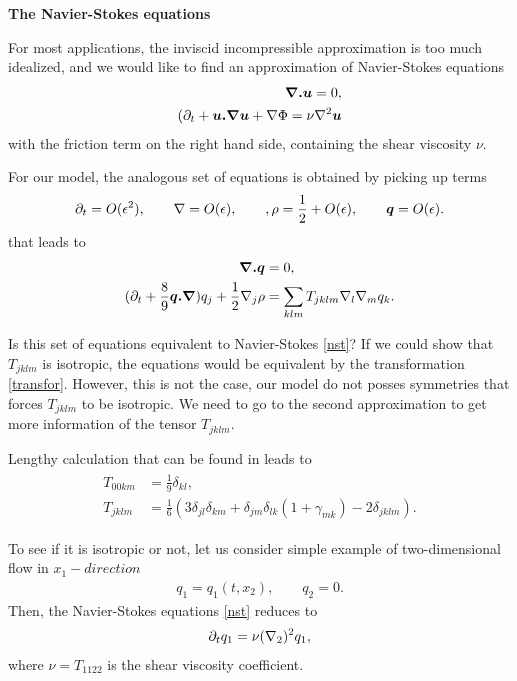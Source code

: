 \bigskip

\textbf{The Navier-Stokes equations}

For most applications, the inviscid incompressible approximation is too much idealized,
and we would like to find an approximation of Navier-Stokes equations
\begin{align} \label{nst}
\begin{split}
\bm{\nabla . u} = 0, \\
(\partial_t + \bm{u.\nabla}\bm{u} + \nabla \Phi = \nu \nabla^2 \bm{u}
\end{split}
\end{align}
with the friction term on the right hand side, containing the shear viscosity $\nu$.

For our model, the analogous set of equations is obtained by picking up terms
\begin{align}
\partial_t = O(\epsilon^2), \qquad \nabla = O(\epsilon), \qquad, \rho = \frac{1}{2} + O(\epsilon), \qquad \bm{q} = O(\epsilon).
\end{align} 
that leads to
\begin{align}
\begin{split}
\bm{\nabla . q} &= 0,\\ 
(\partial_t + \frac{8}{9} \bm{q . \nabla}) q_j + \frac{1}{2}\nabla_j\rho &= \sum_{klm} T_{jklm}\nabla_l \nabla_m q_k.
\end{split}
\end{align}

Is this set of equations equivalent to Navier-Stokes \ref{nst}?
If we could show that $T_{jklm}$ is isotropic, the equations would be equivalent by the transformation \ref{transfor}.
However, this is not the case, our model do not posses symmetries that forces $T_{jklm}$ to be isotropic.
We need to go to the second approximation to get more information of the tensor $T_{jklm}$.

Lengthy calculation that can be found in \cite{nasilowski} leads to
\begin{align} \label{vistens}
\begin{split}
T_{00km} &= \frac{1}{9} \delta_{kl}, \\
T_{jklm} &= \frac{1}{6} (3 \delta_{jl}\delta_{km} + \delta_{jm} \delta_{lk}(1 + \gamma_{mk}) - 2 \delta_{jklm}).
\end{split}
\end{align}

To see if it is isotropic or not, let us consider simple example of two-dimensional flow in $x_1-direction$
\begin{align}
q_1 = q_1(t,x_2), \qquad q_2 = 0.
\end{align}
Then, the Navier-Stokes equations \ref{nst} reduces to 
\begin{align}
\partial_t q_1 = \nu (\nabla_2)^2 q_1,
\end{align}
where $\nu = T_{1122}$ is the shear viscosity coefficient.

